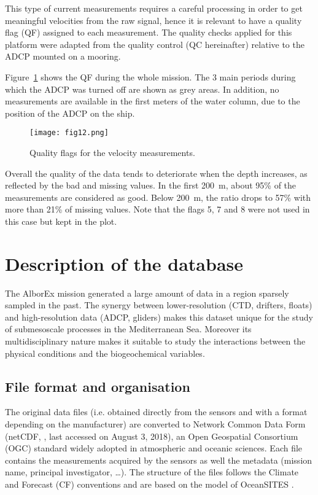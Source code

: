 \documentclass[essd]{copernicus}
\begin{document}
This type of current measurements requires a careful processing in order to get meaningful velocities from the raw signal, hence it is relevant to have a quality flag (QF) assigned to each measurement. The quality checks applied for this platform were adapted from the quality control (QC hereinafter) relative to the ADCP mounted on a mooring.

Figure~\ref{fig9b:adcpQC} shows the QF during the whole mission. The 3 main periods during which the ADCP was turned off are shown as grey areas. In addition, no measurements are available in the first meters of the water column, due to the position of the ADCP on the ship.

\begin{figure}[h]
\texttt{[image: fig12.png]}
\caption{Quality flags for the velocity measurements.\label{fig9b:adcpQC}}
\end{figure}

Overall the quality of the data tends to deteriorate when the depth increases, as reflected by the bad and missing values. In the first 200~m, about 95\% of the measurements are considered as good. Below 200~m, the ratio drops to 57\% with more than 21\% of missing values. Note that the flags 5, 7 and 8 were not used in this case but kept in the plot.

\section{Description of the database\label{sec:database}}

The AlborEx mission generated a large amount of data in a region sparsely sampled in the past. The synergy between lower-resolution (CTD, drifters, floats) and high-resolution data (ADCP, gliders) makes this dataset unique for the study of submesoscale processes in the Mediterranean Sea. Moreover its multidisciplinary nature makes it suitable to study the interactions between the physical conditions and the biogeochemical variables.

\subsection{File format and organisation}

The original data files (i.e. obtained directly from the sensors and with a format depending on the manufacturer) are converted to Network Common Data Form (netCDF, , last accessed on August 3, 2018), an Open Geospatial Consortium (OGC) standard widely adopted in atmospheric and oceanic sciences. Each file contains the measurements acquired by the sensors as well the metadata (mission name, principal investigator, \ldots). The structure of the files follows the Climate and Forecast (CF) conventions \citep{DOMENICO13} and are based on the model of OceanSITES \citep{SEND2010}. 
\end{document}
